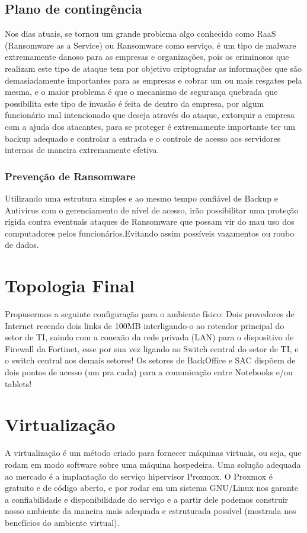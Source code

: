 \documentclass[12pt]{article}
\begin{document}
\subsection{Plano de contingência}
Nos dias atuais, se tornou um grande problema algo conhecido como RaaS (Ransomware as a Service) ou Ransomware como serviço, é um tipo de malware extremamente danoso para as empresas e organizações, pois os criminosos que realizam este tipo de ataque tem por objetivo criptografar as informações que são demasiadamente importantes para as empresas e cobrar um ou mais resgates pela mesma, e o maior problema é que o mecanismo de segurança quebrada que possibilita este tipo de invasão é feita de dentro da empresa, por algum funcionário mal intencionado que deseja através do ataque, extorquir a empresa com a ajuda dos atacantes, para se proteger é extremamente importante ter um backup adequado e controlar a entrada e o controle de acesso aos servidores internos de maneira extremamente efetiva.

\subsubsection{Prevenção de Ransomware}
Utilizando uma estrutura simples e ao mesmo tempo confiável de Backup e Antivírus com o gerenciamento de nível de acesso, irão possibilitar uma proteção rígida contra eventuais ataques de Ransomware que possam vir do mau uso dos computadores pelos funcionários.Evitando assim possíveis vazamentos ou roubo de dados.

\section{Topologia Final}
Propusermos a seguinte configuração para o ambiente físico: Dois provedores de Internet recendo dois links de 100MB interligando-o ao roteador principal do setor de TI, saindo com a conexão da rede privada (LAN) para o dispositivo de Firewall da Fortinet, esse por sua vez ligando ao Switch central do setor de TI, e o switch central aos demais setores! Os setores de BackOffice e SAC dispõem de dois pontos de acesso (um pra cada) para a comunicação entre Notebooks e/ou tablets!

\section{Virtualização}
A virtualização é um método criado para fornecer máquinas virtuais, ou seja, que rodam em modo software sobre uma máquina hospedeira. Uma solução adequada ao mercado é a implantação do serviço hipervisor Proxmox. O Proxmox é gratuito e de código aberto, e por rodar em um sistema GNU/Linux nos garante a confiabilidade e disponibilidade do serviço e a partir dele podemos construir nosso ambiente da maneira mais adequada e estruturada possível (mostrada nos benefícios do ambiente virtual).
\end{document}
